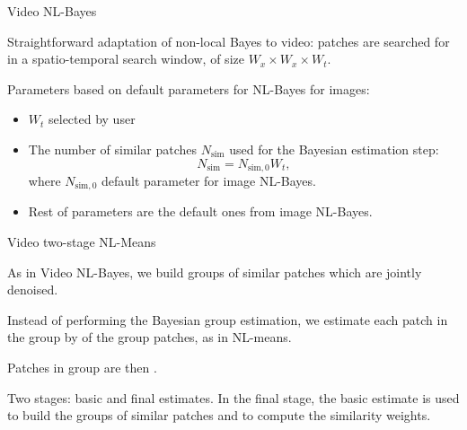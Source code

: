 \documentclass[mathserif]{beamer}
\begin{document}
\begin{frame}{Video NL-Bayes}

	Straightforward adaptation of non-local Bayes to video: patches are
	searched for in a spatio-temporal search window, of size $W_x \times W_x
	\times W_t$. 
	
	\pause

	\vspace{.6cm}

	Parameters based on default parameters for NL-Bayes for images:
	\vspace{.2cm}
	\begin{itemize} \itemsep=.2cm
		\item $W_t$ selected by user
		\item The number of similar patches $N_{\text{sim}}$ used for the
			Bayesian estimation step: 
			\[N_{\text{sim}} = N_{\text{sim},0} W_t,\]
			where $N_{\text{sim},0}$ default parameter for image NL-Bayes.
		\item Rest of parameters are the default ones from image NL-Bayes.
	\end{itemize}

	\vspace{1cm}

\end{frame}

\begin{frame}{Video two-stage NL-Means}

	As in Video NL-Bayes, we build groups of similar patches which are jointly
	denoised. 

	\vspace{.5cm}
	
	Instead of performing the Bayesian group estimation, we estimate each patch
	in the group by  of the
	group patches, as in NL-means.
	
	\vspace{.5cm}
	
	Patches in group are then .

	\vspace{.5cm}
	
	Two stages: basic and final estimates. In the final stage, the basic
	estimate is used to build the groups of similar patches and to compute the
	similarity weights.

\end{frame}
\end{document}
